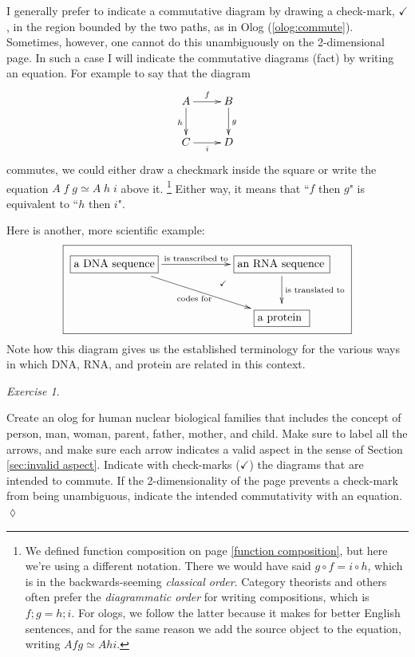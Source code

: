 \documentclass{book}
\def\tn{\textnormal}
\newcommand{\LA}[2]{\ar[#1]^-{\tn {#2}}}
\newcommand{\LAL}[2]{\ar[#1]_-{\tn {#2}}}
\newcommand{\obox}[3]{\stackrel{#1}{\fbox{\parbox{#2}{#3}}}}
\theoremstyle{remark}
\newtheorem{exc}[subsubsection]{Exercise}
\newenvironment{exercise}{\begin{exc}}{\hspace*{\fill}$\lozenge$\end{exc}}
\theoremstyle{definition}
\begin{document}
I generally prefer to indicate a commutative diagram by drawing a check-mark, $\checkmark$, in the region bounded by the two paths, as in Olog (\ref{olog:commute}).  Sometimes, however, one cannot do this unambiguously on the 2-dimensional page.  In such a case I will indicate the commutative diagrams (fact) by writing an equation.  For example to say that the diagram $$\xymatrix{A\ar[r]^f\ar[d]_h&B\ar[d]^g\\C\ar[r]_i&D}$$ commutes, we could either draw a checkmark inside the square or write the equation $A\;f\;g\simeq A\;h\;i$ above it.
\footnote{We defined function composition on page \ref{function composition}, but here we're using a different notation. There we would have said $g\circ f = i\circ h$, which is in the backwards-seeming {\em classical order}. Category theorists and others often prefer the {\em diagrammatic order} for writing compositions, which is $f;g = h;i$. For ologs, we follow the latter because it makes for better English sentences, and for the same reason we add the source object to the equation, writing $A f g \simeq A h i$.}
  Either way, it means that ``$f$ then $g$" is equivalent to ``$h$ then $i$".  

Here is another, more scientific example:
\begin{align*}
\fbox{\xymatrix{
\obox{}{1in}{a DNA sequence}\LA{rr}{is transcribed to}\LAL{drr}{codes for}&\hspace{.1in}&\obox{}{1.1in}{an RNA sequence}\ar@{}[dll]|(.35){\checkmark}\LA{d}{is translated to}\\
&&\obox{}{.6in}{a protein}}}
\end{align*}
Note how this diagram gives us the established terminology for the various ways in which DNA, RNA, and protein are related in this context.

\begin{exercise}\label{exc:family olog}

Create an olog for human nuclear biological families that includes the concept of person, man, woman, parent, father, mother, and child. Make sure to label all the arrows, and make sure each arrow indicates a valid aspect in the sense of Section \ref{sec:invalid aspect}. Indicate with check-marks ($\checkmark$) the diagrams that are intended to commute. If the 2-dimensionality of the page prevents a check-mark from being unambiguous, indicate the intended commutativity with an equation.
\end{exercise}
\end{document}
